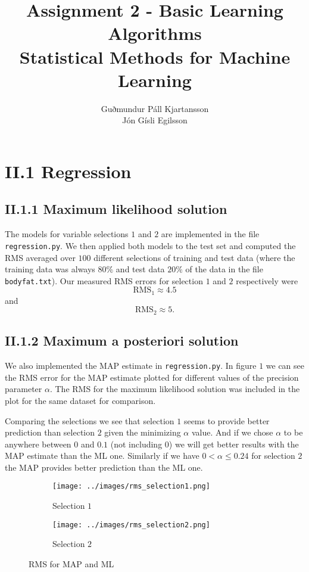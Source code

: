 \documentclass[a4paper,10pt]{article}
\title{
	Assignment 2 - Basic Learning Algorithms	\\
	Statistical Methods for Machine Learning
  }
\author{
	Guðmundur Páll Kjartansson \\
	Jón Gísli Egilsson
}
\begin{document}
\maketitle

\section*{II.1 Regression}

\subsection*{II.1.1 Maximum likelihood solution}

The models for variable selections $1$ and $2$ are implemented in the file \verb=regression.py=. We then applied both models to the test set and computed the RMS averaged over $100$ different selections of training and test data (where the training data was always $80\%$ and test data $20\%$ of the data in the file \verb=bodyfat.txt=). Our measured RMS errors for selection $1$ and $2$ respectively were
$$\text{RMS}_1 \approx 4.5$$
and
$$\text{RMS}_2 \approx 5.$$

\subsection*{II.1.2 Maximum a posteriori solution}

We also implemented the MAP estimate in \verb=regression.py=. In figure $1$ we can see the RMS error for the MAP estimate plotted for different values of the precision parameter $\alpha$. The RMS for the maximum likelihood solution was included in the plot for the same dataset for comparison.

Comparing the selections we see that selection $1$ seems to provide better prediction than selection $2$ given the minimizing $\alpha$ value. And if we chose $\alpha$ to be anywhere between $0$ and $0.1$ (not including $0$) we will get better results with the MAP estimate than the ML one. Similarly if we have $0 < \alpha \leq 0.24$ for selection $2$ the MAP provides better prediction than the ML one.

\begin{figure}[H]
	\centering
	\begin{subfigure}{0.45\textwidth}
  		\centering
  		\texttt{[image: ../images/rms\_selection1.png]}
  		\caption{Selection $1$}
  \end{subfigure}
  \begin{subfigure}{0.45\textwidth}
  		\centering
  		\texttt{[image: ../images/rms\_selection2.png]}
  		\caption{Selection $2$}
  \end{subfigure}
  	\caption{RMS for MAP and ML}
\end{figure}
\end{document}
